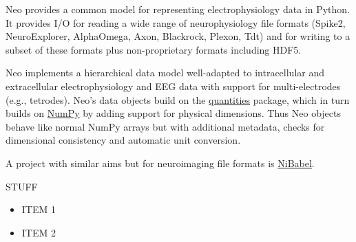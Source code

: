 \begin{multicols}{3}

%


Neo provides a common model for representing
electrophysiology data in Python. It provides I/O for reading a wide
range of neurophysiology file formats (Spike2,
NeuroExplorer, AlphaOmega, Axon, Blackrock, Plexon, Tdt) and for
writing to a subset of these formats plus non-proprietary formats
including HDF5.


Neo implements a hierarchical data model well-adapted to intracellular
and extracellular electrophysiology and EEG data with support for
multi-electrodes (e.g., tetrodes).  Neo's data objects build on
the \href{http://pypi.python.org/pypi/quantities}{quantities} package,
which in turn builds on \href{http://www.numpy.org}{NumPy} by adding
support for physical dimensions. Thus Neo objects behave like
normal NumPy arrays but with additional metadata, checks for
dimensional consistency and automatic unit conversion.

A project with similar aims but for neuroimaging file formats is
\href{http://www.nipy.org/nibabel}{NiBabel}.


STUFF

\begin{itemize}[nolistsep,topsep=0em,leftmargin=1pc]
\item ITEM 1
\item ITEM 2
\end{itemize}

%



\end{multicols}
